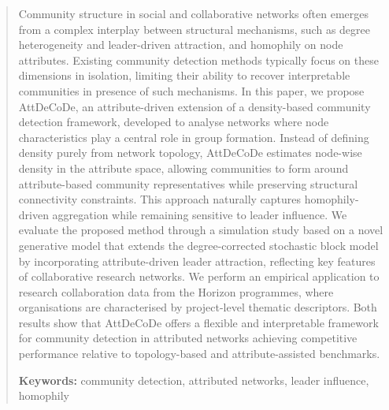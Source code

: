 \documentclass[11pt]{article}
\begin{document}
\begin{abstract}

Community structure in social and collaborative networks often emerges from a complex interplay between structural mechanisms, such as degree heterogeneity and leader-driven attraction, and homophily on node attributes. %
Existing community detection methods typically focus on these dimensions in isolation, limiting their ability to recover interpretable communities in presence of such mechanisms.
In this paper, we propose AttDeCoDe, an attribute-driven extension of a density-based community detection framework, developed to analyse networks where node characteristics play a central role in group formation. Instead of defining density purely from network topology, AttDeCoDe estimates node-wise density in the attribute space, allowing communities to form around attribute-based community representatives while preserving structural connectivity constraints. This approach naturally captures homophily-driven aggregation while remaining sensitive to leader influence.
We evaluate the proposed method through a simulation study based on a novel generative model that extends the degree-corrected stochastic block model by incorporating attribute-driven leader attraction, reflecting key features of collaborative research networks. %
We perform an empirical application to research collaboration data from the Horizon programmes, where organisations are characterised by project-level thematic descriptors. %
Both results show that AttDeCoDe offers a flexible and interpretable framework for community detection in attributed networks achieving competitive performance relative to topology-based and attribute-assisted benchmarks.

\noindent \textbf{Keywords:} community detection, attributed networks, leader influence, homophily
\end{abstract}
\end{document}

